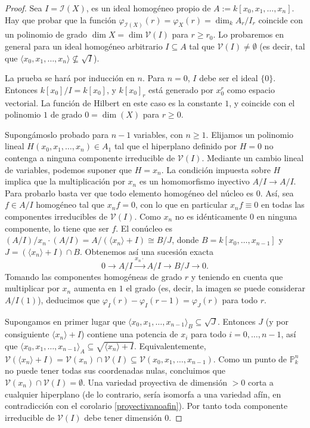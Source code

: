 \documentclass[a4paper,10pt]{book}
\newcommand{\PP}{\mathbb P}
\newcommand{\Pnk}{\PP^n_k}
\newcommand{\II}{{\mathcal I}}
\newcommand{\VV}{{\mathcal V}}
\begin{document}
\begin{proof}
Sea $I=\II(X)$, es un ideal homogéneo propio de $A:=k[x_0,x_1,\ldots,x_n]$. Hay que probar que la función $\varphi_{\II(X)}(r)=\varphi_X(r)=\dim_k A_r/I_r$ coincide con un polinomio de grado $\dim X=\dim\VV(I)$ para $r\geq r_0$. Lo probaremos en general para un ideal homogéneo arbitrario $I\subseteq A$ tal que $\VV(I)\neq\emptyset$ (es decir, tal que $\langle x_0,x_1,\ldots,x_n\rangle\not\subseteq \sqrt{I}$).

 La prueba se hará por inducción en $n$. Para $n=0$, $I$ debe ser el ideal $\{0\}$. Entonces $k[x_0]/I=k[x_0]$, y $k[x_0]_r$ está generado por $x_0^r$ como espacio vectorial. La función de Hilbert en este caso es la constante $1$, y coincide con el polinomio $1$ de grado $0=\dim(X)$ para $r\geq 0$.

Supongámoslo probado para $n-1$ variables, con $n\geq 1$. Elijamos un polinomio lineal $H(x_0,x_1,\ldots,x_n)\in A_1$ tal que el hiperplano definido por $H=0$ no contenga a ninguna componente irreducible de ${\mathcal V}(I)$. Mediante un cambio lineal de variables, podemos suponer que $H=x_n$. La condición impuesta sobre $H$ implica que la multiplicación por $x_n$ es un homomorfismo inyectivo $A/I\to A/I$. Para probarlo basta ver que todo elemento homogéneo del núcleo es 0. Así, sea $f\in A/I$ homogéneo tal que $x_nf=0$, con lo que en particular $x_nf\equiv 0$ en todas las componentes irreducibles de $\VV(I)$. Como $x_n$ no es idénticamente 0 en ninguna componente, lo tiene que ser $f$. El conúcleo es $(A/I)/x_n\cdot(A/I)=A/(\langle x_n\rangle +I)\cong B/J$, donde $B=k[x_0,\ldots,x_{n-1}]$ y $J=(\langle x_n\rangle +I)\cap B$. Obtenemos así una sucesión exacta
$$
0\to A/I\stackrel{x_n\cdot}{\to} A/I \to B/J\to 0.
$$
Tomando las componentes homogéneas de grado $r$ y teniendo en cuenta que multiplicar por $x_n$ aumenta en $1$ el grado (es, decir, la imagen se puede considerar $A/I(1)$), deducimos que $\varphi_I(r)-\varphi_I(r-1)=\varphi_J(r)$ para todo $r$.

Supongamos en primer lugar que $\langle x_0,x_1,\ldots,x_{n-1}\rangle_B\subseteq \sqrt{J}$. Entonces $J$ (y por consiguiente $\langle x_n\rangle +I$) contiene una potencia de $x_i$ para todo $i=0,\ldots,n-1$, así que $\langle x_0,x_1,\ldots,x_{n-1}\rangle_A\subseteq \sqrt{\langle x_n\rangle +I}$. Equivalentemente, $\VV(\langle x_n\rangle +I)=\VV(x_n)\cap\VV(I)\subseteq\VV(x_0,x_1,\ldots,x_{n-1})$. Como un punto de $\Pnk$ no puede tener todas sus coordenadas nulas, concluimos que $\VV(x_n)\cap\VV(I)=\emptyset$. Una variedad proyectiva de dimensión $>0$ corta a cualquier hiperplano (de lo contrario, sería isomorfa a una variedad afín, en contradicción con el corolario \ref{proyectivanoafin}). Por tanto toda componente irreducible de $\VV(I)$ debe tener dimensión $0$.


\end{proof}
\end{document}
